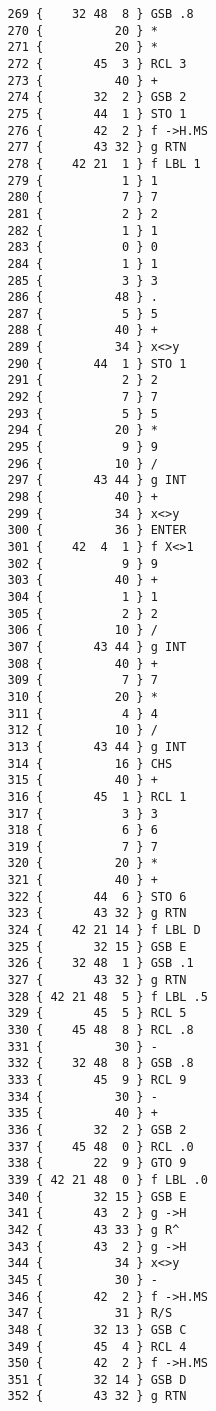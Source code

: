 \documentclass[english,a4paper,onepage, 10pt]{scrbook}
\begin{document}
\begin{multicols}{2}
\begin{lstlisting}
   269 {    32 48  8 } GSB .8
   270 {          20 } *
   271 {          20 } *
   272 {       45  3 } RCL 3
   273 {          40 } +
   274 {       32  2 } GSB 2
   275 {       44  1 } STO 1
   276 {       42  2 } f ->H.MS
   277 {       43 32 } g RTN
   278 {    42 21  1 } f LBL 1
   279 {           1 } 1
   280 {           7 } 7
   281 {           2 } 2
   282 {           1 } 1
   283 {           0 } 0
   284 {           1 } 1
   285 {           3 } 3
   286 {          48 } .
   287 {           5 } 5
   288 {          40 } +
   289 {          34 } x<>y
   290 {       44  1 } STO 1
   291 {           2 } 2
   292 {           7 } 7
   293 {           5 } 5
   294 {          20 } *
   295 {           9 } 9
   296 {          10 } /
   297 {       43 44 } g INT
   298 {          40 } +
   299 {          34 } x<>y
   300 {          36 } ENTER
   301 {    42  4  1 } f X<>1
   302 {           9 } 9
   303 {          40 } +
   304 {           1 } 1
   305 {           2 } 2
   306 {          10 } /
   307 {       43 44 } g INT
   308 {          40 } +
   309 {           7 } 7
   310 {          20 } *
   311 {           4 } 4
   312 {          10 } /
   313 {       43 44 } g INT
   314 {          16 } CHS
   315 {          40 } +
   316 {       45  1 } RCL 1
   317 {           3 } 3
   318 {           6 } 6
   319 {           7 } 7
   320 {          20 } *
   321 {          40 } +
   322 {       44  6 } STO 6
   323 {       43 32 } g RTN
   324 {    42 21 14 } f LBL D
   325 {       32 15 } GSB E
   326 {    32 48  1 } GSB .1
   327 {       43 32 } g RTN
   328 { 42 21 48  5 } f LBL .5
   329 {       45  5 } RCL 5
   330 {    45 48  8 } RCL .8
   331 {          30 } -
   332 {    32 48  8 } GSB .8
   333 {       45  9 } RCL 9
   334 {          30 } -
   335 {          40 } +
   336 {       32  2 } GSB 2
   337 {    45 48  0 } RCL .0
   338 {       22  9 } GTO 9
   339 { 42 21 48  0 } f LBL .0
   340 {       32 15 } GSB E
   341 {       43  2 } g ->H
   342 {       43 33 } g R^
   343 {       43  2 } g ->H
   344 {          34 } x<>y
   345 {          30 } -
   346 {       42  2 } f ->H.MS
   347 {          31 } R/S
   348 {       32 13 } GSB C
   349 {       45  4 } RCL 4
   350 {       42  2 } f ->H.MS
   351 {       32 14 } GSB D
   352 {       43 32 } g RTN
\end{lstlisting}
\end{multicols}
\newpage
\appendix
\end{document}

